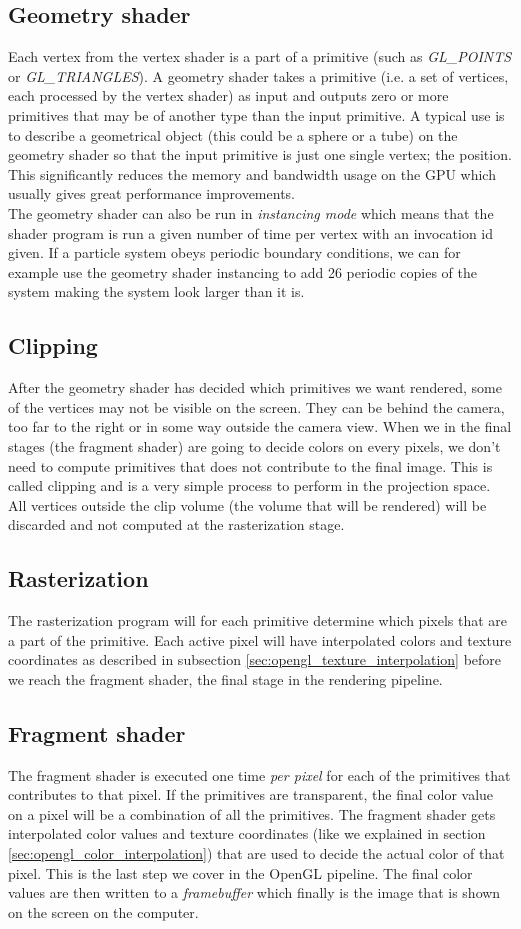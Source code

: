 \subsection{Geometry shader}
Each vertex from the vertex shader is a part of a primitive (such as \textit{GL\_POINTS} or \textit{GL\_TRIANGLES}). A geometry shader takes a primitive (i.e. a set of vertices, each processed by the vertex shader) as input and outputs zero or more primitives that may be of another type than the input primitive. A typical use is to describe a geometrical object (this could be a sphere or a tube) on the geometry shader so that the input primitive is just one single vertex; the position. This significantly reduces the memory and bandwidth usage on the GPU which usually gives great performance improvements.\\
The geometry shader can also be run in \textit{instancing mode} which means that the shader program is run a given number of time per vertex with an invocation id given. If a particle system obeys periodic boundary conditions, we can for example use the geometry shader instancing to add 26 periodic copies of the system making the system look larger than it is. 

\subsection{Clipping}
After the geometry shader has decided which primitives we want rendered, some of the vertices may not be visible on the screen. They can be behind the camera, too far to the right or in some way outside the camera view. When we in the final stages (the fragment shader) are going to decide colors on every pixels, we don't need to compute primitives that does not contribute to the final image. This is called clipping and is a very simple process to perform in the projection space. All vertices outside the clip volume (the volume that will be rendered) will be discarded and not computed at the rasterization stage.
\subsection{Rasterization}
The rasterization program will for each primitive determine which pixels that are a part of the primitive. Each active pixel will have interpolated colors and texture coordinates as described in subsection \ref{sec:opengl_texture_interpolation} before we reach the fragment shader, the final stage in the rendering pipeline.
\subsection{Fragment shader}
The fragment shader is executed one time \textit{per pixel} for each of the primitives that contributes to that pixel. If the primitives are transparent, the final color value on a pixel will be a combination of all the primitives. The fragment shader gets interpolated color values and texture coordinates (like we explained in section \ref{sec:opengl_color_interpolation}) that are used to decide the actual color of that pixel. This is the last step we cover in the OpenGL pipeline. The final color values are then written to a \textit{framebuffer} which finally is the image that is shown on the screen on the computer.